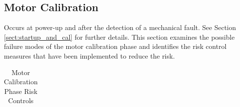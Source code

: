 \documentclass[]{article}
\begin{document}
\subsection{Motor Calibration}
Occurs at power-up and after the detection of a mechanical fault.  See Section \ref{sect:startup_and_cal} for further details. This section examines the possible failure modes of the motor calibration phase and identifies the risk control measures that have been implemented to reduce the risk.



\begin{center}
\begin{table}[h]
\caption{Motor Calibration Phase Risk Controls}
\label{tab:motor_cal_risk}
\begin{tabular}{ |p{3.5cm}|p{3cm}| p{3.5cm}| p{3.5cm}|}


\end{tabular}
\end{table}
\end{center}
\end{document}
